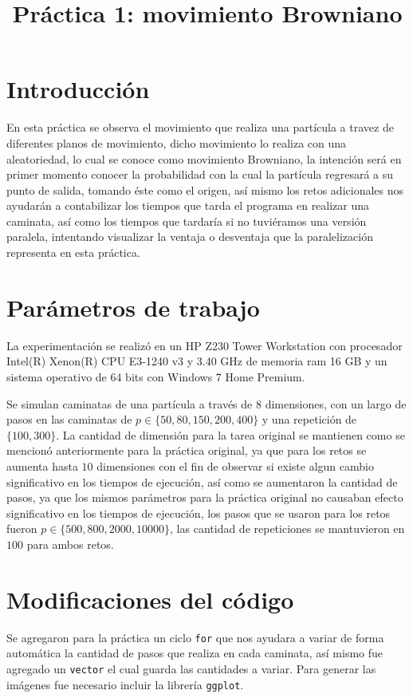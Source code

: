 \documentclass[a4paper]{article}
\title{Práctica 1: movimiento Browniano}
\date{}
\begin{document}
\maketitle

\section{Introducci\'on}
En esta práctica se observa el movimiento que realiza una partícula a travez de diferentes planos de movimiento, dicho movimiento lo realiza con una aleatoriedad, lo cual se conoce como movimiento Browniano, la intención será en primer momento conocer la probabilidad con la cual la partícula regresará a su punto de salida, tomando éste como el origen, así mismo los retos adicionales nos ayudarán a contabilizar los tiempos que tarda el programa en realizar una caminata, así como los tiempos que tardaría si no tuviéramos una versión paralela, intentando visualizar la ventaja o desventaja que la paralelización representa en esta práctica.
\section{Par\'ametros de trabajo}
La experimentación se realizó en un HP Z230 Tower Workstation con procesador Intel(R) Xenon(R) CPU E3-1240 v3 y 3.40 GHz de memoria ram 16 GB y un sistema operativo de 64 bits con Windows 7 Home Premium.

Se simulan caminatas de una partícula a través de $8$ dimensiones, con un largo de pasos en las caminatas de $p \in \{50,80,150,200,400\}$ y una repetición de $\{100, 300\}$. La cantidad de dimensión para la tarea original se mantienen como se mencionó anteriormente para la práctica original, ya que para los retos se aumenta hasta $10$ dimensiones con el fin de observar si existe algun cambio significativo en los tiempos de ejecución, así como se aumentaron la cantidad de pasos, ya que los mismos parámetros para la práctica original no causaban efecto significativo en los tiempos de ejecución, los pasos que se usaron para los retos fueron $p \in \{500,800,2000,10000\}$, las cantidad de repeticiones se mantuvieron en $100$ para ambos retos.

\section{Modificaciones del código}
Se agregaron para la práctica un ciclo \texttt{for} que nos ayudara a variar de forma automática la cantidad de pasos que realiza en cada caminata, así mismo fue agregado un \texttt{vector} el cual guarda las cantidades a variar. Para generar las imágenes fue necesario incluir la librería \texttt{ggplot}.
\end{document}
